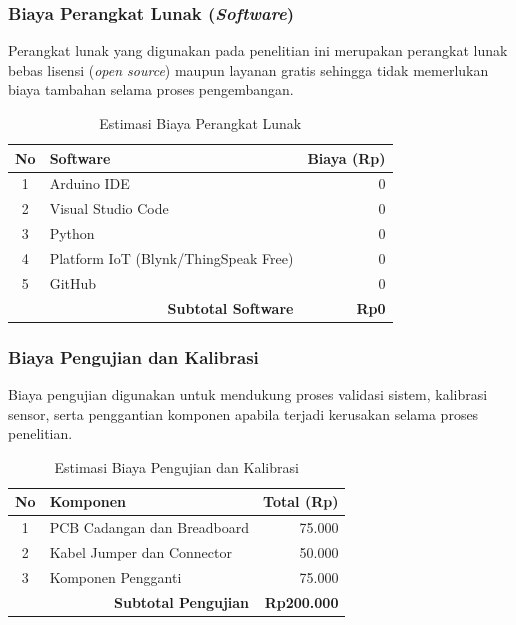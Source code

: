 \documentclass{elsinta}
\begin{document}
\subsubsection{Biaya Perangkat Lunak (\textit{Software})}

Perangkat lunak yang digunakan pada penelitian ini merupakan perangkat lunak bebas lisensi (\textit{open source}) maupun layanan gratis sehingga tidak memerlukan biaya tambahan selama proses pengembangan.

\begin{table}[H]
\centering
\caption{Estimasi Biaya Perangkat Lunak}
\label{tab:biaya-software}

\begin{tabular}{|c|p{8cm}|r|}
\hline
\textbf{No} &
\centering\textbf{Software} &
\textbf{Biaya (Rp)}\\
\hline

1 & Arduino IDE & 0\\
\hline
2 & Visual Studio Code & 0\\
\hline
3 & Python & 0\\
\hline
4 & Platform IoT (Blynk/ThingSpeak Free) & 0\\
\hline
5 & GitHub & 0\\
\hline

\multicolumn{2}{|r|}{\textbf{Subtotal Software}} &
\textbf{Rp0}\\
\hline

\end{tabular}
\end{table}


\subsubsection{Biaya Pengujian dan Kalibrasi}

Biaya pengujian digunakan untuk mendukung proses validasi sistem, kalibrasi sensor, serta penggantian komponen apabila terjadi kerusakan selama proses penelitian.

\begin{table}[H]
\centering
\caption{Estimasi Biaya Pengujian dan Kalibrasi}
\label{tab:pengujian}

\begin{tabular}{|c|p{8cm}|r|}
\hline
\textbf{No} &
\centering\textbf{Komponen} &
\textbf{Total (Rp)}\\
\hline

1 & PCB Cadangan dan Breadboard & 75.000\\
\hline
2 & Kabel Jumper dan Connector & 50.000\\
\hline
3 & Komponen Pengganti & 75.000\\
\hline

\multicolumn{2}{|r|}{\textbf{Subtotal Pengujian}} &
\textbf{Rp200.000}\\
\hline

\end{tabular}
\end{table}
\end{document}
